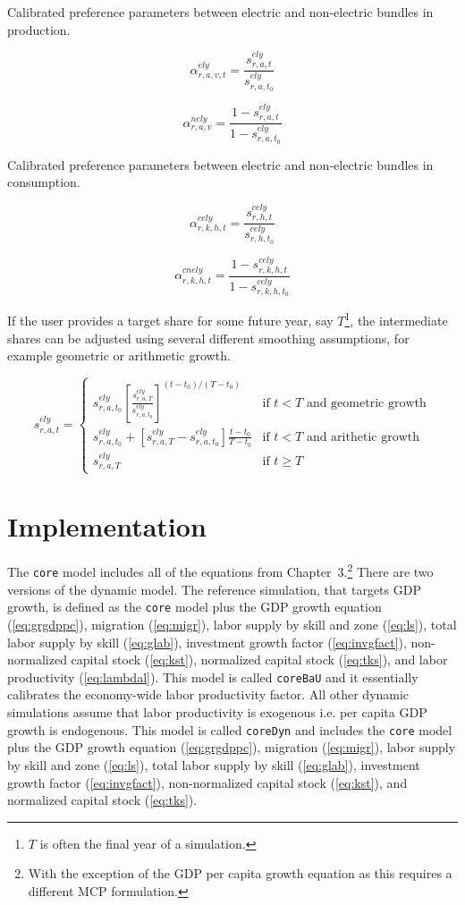 \documentclass[11pt,letterpaper]{report}
\begin{document}
Calibrated preference parameters between electric and
non-electric bundles in production.

\[
\alpha^{\mathit{ely}}_{\mathit{r,a,v,t}}
= \frac{s^{\mathit{ely}}_{r,a,t}}{s^{\mathit{ely}}_{r,a,t_0}}
\]

\[
\alpha^{\mathit{nely}}_{\mathit{r,a,v}}
= \frac{1-s^{\mathit{ely}}_{r,a,t}}{1-s^{\mathit{ely}}_{r,a,t_0}}
\]

\noindent Calibrated preference parameters between electric and
non-electric bundles in consumption.

\[
 \alpha^{\mathit{cely}}_{\mathit{r,k,h,t}}
= \frac{s^{\mathit{cely}}_{r,h,t}}{s^{\mathit{cely}}_{r,h,t_0}}
\]

\[
\alpha^{\mathit{cnely}}_{\mathit{r,k,h,t}}
= \frac{1-s^{\mathit{cely}}_{r,k,h,t}}{1-s^{\mathit{cely}}_{r,k,h,t_0}}
\]

If the user provides a target share for some future year, say $T$\footnote{$T$ is often the final year of a simulation.}, the intermediate shares can be adjusted using several different
smoothing assumptions, for example geometric or arithmetic growth.

\[
s^{\mathit{ely}}_{r,a,t} =
\begin{cases}
s^{\mathit{ely}}_{r,a,t_0}
\left[\frac{s^{\mathit{ely}}_{r,a,T}}{s^{\mathit{ely}}_{r,a,t_0}}
\right]^{(t-t_0)/(T-t_0)} & \textrm{if } t < T \textrm{ and geometric growth} \\
s^{\mathit{ely}}_{r,a,t_0} +
\left[{s^{\mathit{ely}}_{r,a,T}}-{s^{\mathit{ely}}_{r,a,t_0}}
\right]
\displaystyle \frac{t-t_0}{T-t_0} & \textrm{if } t < T \textrm{ and arithetic growth} \\
s^{\mathit{ely}}_{r,a,T} & \textrm{if } t \ge T
\end{cases}
\]

\section{Implementation}

The \texttt{core} model includes all of the equations from
Chapter~3.\footnote{With the exception of the GDP per capita growth equation as
this requires a different MCP formulation.} There are two versions of the
dynamic model. The reference simulation, that targets GDP growth, is defined as
the \texttt{core} model plus the GDP growth equation (\ref{eq:grgdppc}),
migration (\ref{eq:migr}), labor supply by skill and zone (\ref{eq:ls}), total
labor supply by skill (\ref{eq:glab}), investment growth factor
(\ref{eq:invgfact}), non-normalized capital stock (\ref{eq:kst}), normalized
capital stock (\ref{eq:tks}), and labor productivity (\ref{eq:lambdal}). This
model is called \texttt{coreBaU} and it essentially calibrates the economy-wide
labor productivity factor. All other dynamic simulations assume that labor
productivity is exogenous i.e. per capita GDP growth is endogenous. This model
is called \texttt{coreDyn} and includes the \texttt{core} model plus the GDP
growth equation (\ref{eq:grgdppc}), migration (\ref{eq:migr}), labor supply by
skill and zone (\ref{eq:ls}), total labor supply by skill (\ref{eq:glab}),
investment growth factor (\ref{eq:invgfact}), non-normalized capital stock
(\ref{eq:kst}), and normalized capital stock (\ref{eq:tks}).
\end{document}
